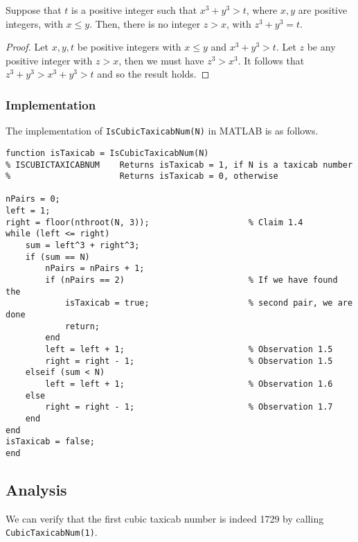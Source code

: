 \begin{observation}
	Suppose that $t$ is a positive integer such that $x^3 + y^3 > t$, where $x, y$ are positive integers, with $x \leq y$. Then, there is no integer $z > x$, with $z^3 + y^3 = t$.
\end{observation}
\begin{proof}
	Let $x, y, t$ be positive integers with $x \leq y$ and $x^3 + y^3 > t$. Let $z$ be any positive integer with $z > x$, then we must have $z^3 > x^3$. It follows that $z^3 + y^3 > x^3 + y^3 > t$ and so the result holds.
\end{proof}

\newpage
\subsubsection{Implementation}
The implementation of \lstinline|IsCubicTaxicabNum(N)| in MATLAB is as follows.

\begin{lstlisting}
function isTaxicab = IsCubicTaxicabNum(N)
% ISCUBICTAXICABNUM    Returns isTaxicab = 1, if N is a taxicab number
%                      Returns isTaxicab = 0, otherwise

nPairs = 0;
left = 1;
right = floor(nthroot(N, 3));                    % Claim 1.4
while (left <= right)
    sum = left^3 + right^3;
    if (sum == N)
        nPairs = nPairs + 1;
        if (nPairs == 2)                         % If we have found the
            isTaxicab = true;                    % second pair, we are done
            return;
        end
        left = left + 1;                         % Observation 1.5
        right = right - 1;                       % Observation 1.5
    elseif (sum < N)
        left = left + 1;                         % Observation 1.6
    else
        right = right - 1;                       % Observation 1.7
    end
end
isTaxicab = false;
end
\end{lstlisting}


\subsection{Analysis}

\begin{example}
	We can verify that the first cubic taxicab number is indeed 1729 by calling \lstinline|CubicTaxicabNum(1)|.
\end{example}

